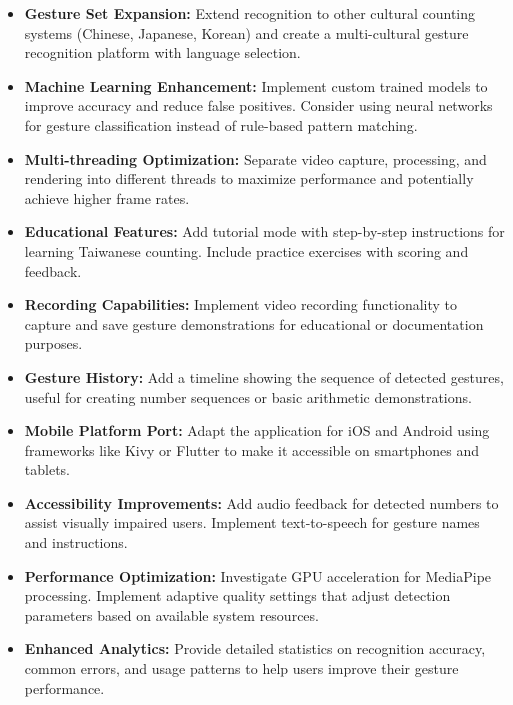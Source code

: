 \documentclass{article}
\begin{document}
\begin{itemize}
	\item \textbf{Gesture Set Expansion:} Extend recognition to other cultural counting systems (Chinese, Japanese, Korean) and create a multi-cultural gesture recognition platform with language selection.

\item \textbf{Machine Learning Enhancement:} Implement custom trained models to improve accuracy and reduce false positives. Consider using neural networks for gesture classification instead of rule-based pattern matching.

\item \textbf{Multi-threading Optimization:} Separate video capture, processing, and rendering into different threads to maximize performance and potentially achieve higher frame rates.

\item \textbf{Educational Features:} Add tutorial mode with step-by-step instructions for learning Taiwanese counting. Include practice exercises with scoring and feedback.

\item \textbf{Recording Capabilities:} Implement video recording functionality to capture and save gesture demonstrations for educational or documentation purposes.

\item \textbf{Gesture History:} Add a timeline showing the sequence of detected gestures, useful for creating number sequences or basic arithmetic demonstrations.

\item \textbf{Mobile Platform Port:} Adapt the application for iOS and Android using frameworks like Kivy or Flutter to make it accessible on smartphones and tablets.

\item \textbf{Accessibility Improvements:} Add audio feedback for detected numbers to assist visually impaired users. Implement text-to-speech for gesture names and instructions.

\item \textbf{Performance Optimization:} Investigate GPU acceleration for MediaPipe processing. Implement adaptive quality settings that adjust detection parameters based on available system resources.

\item \textbf{Enhanced Analytics:} Provide detailed statistics on recognition accuracy, common errors, and usage patterns to help users improve their gesture performance.
\end{itemize}
\end{document}
